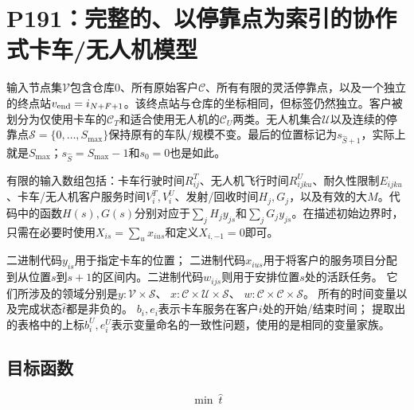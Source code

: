 \documentclass[11pt]{article}
\begin{document}
\section*{P191：完整的、以停靠点为索引的协作式卡车/无人机模型}
输入节点集$\mathcal V$包含仓库$0$、所有原始客户$\mathcal C$、所有有限的灵活停靠点，以及一个独立的终点站$v_{\rm end}=i_{N+F+1}$。该终点站与仓库的坐标相同，但标签仍然独立。客户被划分为仅使用卡车的$\mathcal C_T$和适合使用无人机的$\mathcal C_U$两类。无人机集合$\mathcal U$以及连续的停靠点$\mathcal S=\{0,\ldots,S_{\max}\}$保持原有的车队/规模不变。最后的位置标记为$s_{\hat S+1}$，实际上就是$S_{\max}$；$s_{\hat S}=S_{\max}-1$和$s_0=0$也是如此。

有限的输入数组包括：卡车行驶时间$R^T_{ij}$、无人机飞行时间$R^U_{ijku}$、耐久性限制$E_{ijku}$、卡车/无人机客户服务时间$V^T_i,V^U_i$、发射/回收时间$H_j,G_j$，以及有效的大$M$。代码中的函数$H(s),G(s)$分别对应于$\sum_j H_jy_{js}$和$\sum_jG_jy_{js}$。在描述初始边界时，只需在必要时使用$X_{is}=\sum_u x_{ius}$和定义$X_{i,-1}=0$即可。

二进制代码$y_{is}$用于指定卡车的位置；
二进制代码$x_{ius}$用于将客户的服务项目分配到从位置$s$到$s+1$的区间内。二进制代码$w_{ijs}$则用于安排位置$s$处的活跃任务。
它们所涉及的领域分别是$y:\mathcal V\times\mathcal S$、
$x:\mathcal C\times\mathcal U\times\mathcal S$、
$w:\mathcal C\times\mathcal C\times\mathcal S$。
所有的时间变量以及完成状态$\hat t$都是非负的。
$b_i,e_i$表示卡车服务在客户$i$处的开始/结束时间；
提取出的表格中的上标$b_i^U,e_i^U$表示变量命名的一致性问题，使用的是相同的变量家族。
\subsection*{目标函数}
\[\min\ \hat t\]
\end{document}
